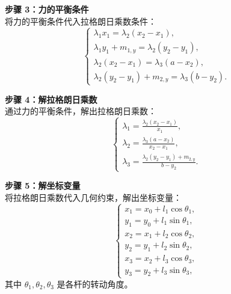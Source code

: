 \documentclass[12pt, a4paper, oneside, UTF8]{ctexbook}  %
\begin{document}
\begin{example}
\begin{solution}
    \noindent \textbf{步骤 3：力的平衡条件} \\
    将力的平衡条件代入拉格朗日乘数条件：
    \[
    \begin{cases}
    \lambda_1 x_1 = \lambda_2 (x_2 - x_1), \\
    \lambda_1 y_1 + m_{1,y} = \lambda_2 (y_2 - y_1), \\
    \lambda_2 (x_2 - x_1) = \lambda_3 (a - x_2), \\
    \lambda_2 (y_2 - y_1) + m_{2,y} = \lambda_3 (b - y_2).
    \end{cases}
    \]
    
    \noindent \textbf{步骤 4：解拉格朗日乘数} \\
    通过力的平衡条件，解出拉格朗日乘数：
    \[
    \begin{cases}
    \lambda_1 = \frac{\lambda_2 (x_2 - x_1)}{x_1}, \\
    \lambda_2 = \frac{\lambda_3 (a - x_2)}{x_2 - x_1}, \\
    \lambda_3 = \frac{\lambda_2 (y_2 - y_1) + m_{2,y}}{b - y_2}.
    \end{cases}
    \]
    
    \noindent \textbf{步骤 5：解坐标变量} \\
    将拉格朗日乘数代入几何约束，解出坐标变量：
    \[
    \begin{cases}
    x_1 = x_0 + l_1 \cos \theta_1, \\
    y_1 = y_0 + l_1 \sin \theta_1, \\
    x_2 = x_1 + l_2 \cos \theta_2, \\
    y_2 = y_1 + l_2 \sin \theta_2, \\
    x_3 = x_2 + l_3 \cos \theta_3, \\
    y_3 = y_2 + l_3 \sin \theta_3,
    \end{cases}
    \]
    其中 \( \theta_1, \theta_2, \theta_3 \) 是各杆的转动角度。
\end{solution}
\begin{solution}

\end{solution}

\end{example}





























\ifx\allfiles\undefined
\end{document}
